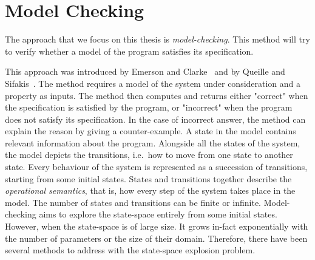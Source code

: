 \chapter{Model Checking}
\label{section:model:checking}
%
%
%

The approach that we focus on this thesis is
\emph{model-checking}.
%
%
This method will try to verify whether a model of the program
satisfies its specification.


This approach was introduced by Emerson and Clarke~\cite{CE82} and by Queille and Sifakis~\cite{QS82}. The method requires a model of the system under
consideration and a property as inputs. The method then computes and returns either "correct" when the specification is satisfied by the program, or "incorrect" when the program does not satisfy its specification. In the case of incorrect answer, the method can explain the reason by giving a counter-example. A state in the model contains relevant information about the program. Alongside all the states of the system, the model depicts the
transitions, i.e.\ how to move from one state to another state. Every behaviour of the system is represented as a succession of transitions, starting from some initial states. States and transitions together describe the \emph{operational
  semantics}, that is, how every step of the system takes place in the model. The number of states and transitions can be finite or infinite. Model-checking aims to explore the state-space entirely from some initial states. However, when the state-space is of large size. It grows in-fact
exponentially with the number of parameters or the size of their
domain. Therefore, there have been several methods to address with the
state-space explosion problem.

